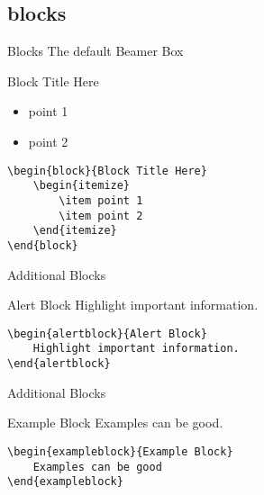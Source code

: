 \documentclass[compress]{beamer}
\begin{document}
\subsection{blocks}


\begin{frame}[containsverbatim]{Blocks}
The default Beamer Box
\begin{block}{Block Title Here}
	\begin{itemize}
		\item point 1
		\item point 2
	\end{itemize}
\end{block}
\begin{lstlisting}
\begin{block}{Block Title Here}
	\begin{itemize}
		\item point 1
		\item point 2
	\end{itemize}
\end{block}
\end{lstlisting}
\end{frame}


\begin{frame}[containsverbatim]{Additional Blocks}
\begin{alertblock}{Alert Block}
	Highlight important information.
\end{alertblock}
\begin{lstlisting}
\begin{alertblock}{Alert Block}
	Highlight important information.
\end{alertblock}
\end{lstlisting}

\end{frame}


\begin{frame}[containsverbatim]{Additional Blocks}

\begin{exampleblock}{Example Block}
	Examples can be good.
\end{exampleblock}
\begin{lstlisting}
\begin{exampleblock}{Example Block}
	Examples can be good
\end{exampleblock}
\end{lstlisting}
\end{frame}
\end{document}
